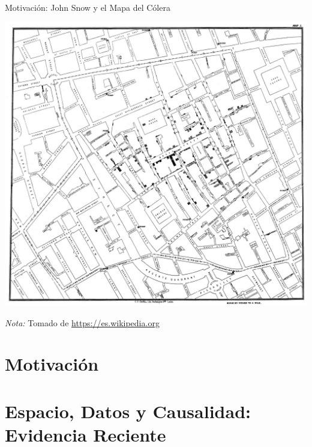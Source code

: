 \documentclass{beamer}
\begin{document}
\begin{frame}{Motivación: John Snow y el Mapa del Cólera}
\begin{center}
\includegraphics[scale=0.16]{figures/map_jhon_snow.jpg}
\end{center}
\textit{Nota:} Tomado de \href{https://es.wikipedia.org/wiki/John_Snow\#/media/Archivo:Snow-cholera-map-1.jpg}{https://es.wikipedia.org}
\end{frame}
    
\section{Motivación}
\section{Espacio, Datos y Causalidad: Evidencia Reciente}
\begin{frame}[noframenumbering]
\tableofcontents[currentsection]
\end{frame}
\end{document}
